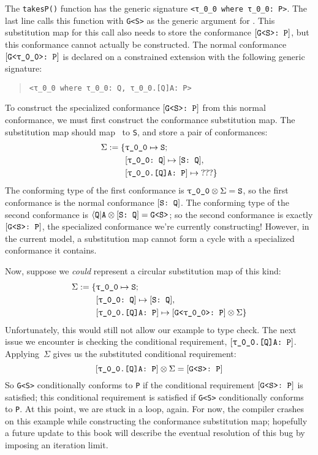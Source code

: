 \documentclass[../generics]{subfiles}
\begin{document}
The \texttt{takesP()} function has the generic signature \verb|<τ_0_0 where τ_0_0: P>|. The last line calls this function with \texttt{G<S>} as the generic argument for \rT. This substitution map for this call also needs to store the conformance $[\texttt{G<S>:~P}]$, but this conformance cannot actually be constructed. The normal conformance $\ConfReq{G<\rT>}{P}$ is declared on a constrained extension with the following generic signature:
\begin{quote}
\begin{verbatim}
<τ_0_0 where τ_0_0: Q, τ_0_0.[Q]A: P>
\end{verbatim}
\end{quote}
To construct the specialized conformance $[\texttt{G<S>:~P}]$ from this normal conformance, we must first construct the conformance substitution map. The substitution map should map \rT\ to \texttt{S}, and store a pair of conformances:
\begin{align*}
\Sigma := \SubstMapC{
&\SubstType{\rT}{S}}{
\\
&\SubstConf{\rT}{S}{Q},\\
&\ConfReq{\rT.[Q]A}{P}\mapsto\text{???}
}
\end{align*}
The conforming type of the first conformance is $\rT\otimes\Sigma=\texttt{S}$, so the first conformance is the normal conformance $[\texttt{S:~Q}]$. The conforming type of the second conformance is 
$\langle\texttt{Q}|\texttt{A}\otimes[\texttt{S:~Q}]=\texttt{G<S>}$; so the second conformance is exactly $[\texttt{G<S>:~P}]$, the specialized conformance we're currently constructing! However, in the current model, a substitution map cannot form a cycle with a specialized conformance it contains.

Now, suppose we \emph{could} represent a circular substitution map of this kind:
\begin{align*}
\Sigma := \SubstMapC{&\SubstType{\rT}{S}}{
\\
&\SubstConf{\rT}{S}{Q},\\
&\ConfReq{\rT.[Q]A}{P}\mapsto\ConfReq{G<\rT>}{P}\otimes\Sigma
}
\end{align*}
Unfortunately, this would still not allow our example to type check. The next issue we encounter is checking the conditional requirement, $\ConfReq{\rT.[Q]A}{P}$. Applying~$\Sigma$ gives us the substituted conditional requirement:
\[\ConfReq{\rT.[Q]A}{P}\otimes\Sigma=\ConfReq{G<S>}{P}\]
So \texttt{G<S>} conditionally conforms to \texttt{P} if the conditional requirement $[\texttt{G<S>:~P}]$ is satisfied; this conditional requirement is satisfied if \texttt{G<S>} conditionally conforms to \texttt{P}. At this point, we are stuck in a loop, again. For now, the compiler crashes on this example while constructing the conformance substitution map; hopefully a future update to this book will describe the eventual resolution of this bug by imposing an iteration limit.
\end{document}
